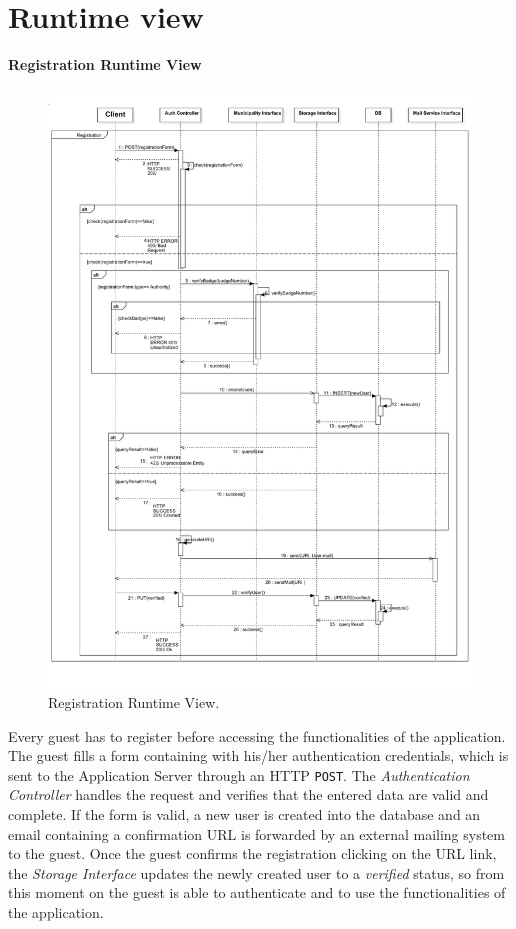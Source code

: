 \documentclass{report}
\begin{document}
\section{Runtime view}
\begin{center}\large{\textbf{Registration Runtime View}}\end{center}
\begin{figure}[H]
	\begin{center}
	\includegraphics[width=.90\textwidth]{img/Registrationn.pdf}
    \end{center}
    \label{fig:RegistrationSD}
	\caption{Registration Runtime View.}
\end{figure}
\clearpage
\noindent Every guest has to register before accessing the functionalities of the application. The guest fills a form containing with his/her authentication credentials, which is sent to the Application Server through an HTTP \texttt{POST}. The \textit{Authentication Controller} handles the request and verifies that the entered data are valid and complete. If the form is valid, a new user is created into the database and an email containing a confirmation URL is forwarded by an external mailing system to the guest. Once the guest confirms the registration clicking on the URL link, the \textit{Storage Interface} updates the newly created user to a \textit{verified} status, so from this moment on the guest is able to authenticate and to use the functionalities of the application.
\end{document}

